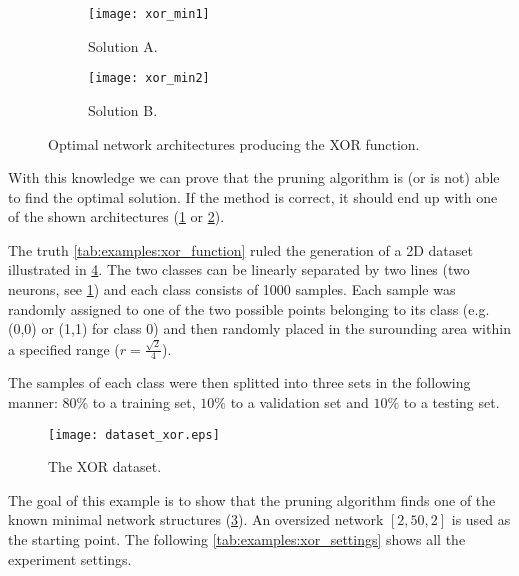 \begin{figure}[H]
\centering
\begin{subfigure}{.4\textwidth}
  \centering
  \texttt{[image: xor\_min1]}
  \caption{Solution A.}
  \label{fig:examples:xor_min1}
\end{subfigure}
\begin{subfigure}{.4\textwidth}
  \centering
  \texttt{[image: xor\_min2]}
  \caption{Solution B.}
  \label{fig:examples:xor_min2}
\end{subfigure}
\caption{Optimal network architectures producing the XOR function.}
\label{fig:examples:xor_solutions}
\end{figure}

With this knowledge we can prove that the pruning algorithm is (or is not) able to find the optimal solution. If the method is correct, it should end up with one of the shown architectures (\cref{fig:examples:xor_min1} or \cref{fig:examples:xor_min2}).

The truth \cref{tab:examples:xor_function} ruled the generation of a 2D dataset illustrated in \cref{fig:examples:dataset_xor}. The two classes can be linearly separated by two lines (two neurons, see \cref{fig:examples:xor_min1}) and each class consists of 1000 samples. Each sample was randomly assigned to one of the two possible points belonging to its class (e.g. (0,0) or (1,1) for class 0) and then randomly placed in the surounding area within a specified range ($ r = \frac{\sqrt{2}}{4} $).

The samples of each class were then splitted into three sets in the following manner: $ 80\% $ to a training set, $ 10\% $ to a validation set and $ 10\% $ to a testing set.

\begin{figure}[H]
\centering
\texttt{[image: dataset\_xor.eps]}
\caption{The XOR dataset.}
\label{fig:examples:dataset_xor}
\end{figure}

The goal of this example is to show that the pruning algorithm finds one of the known minimal network structures (\cref{fig:examples:xor_solutions}). An oversized network $ [2, 50, 2] $ is used as the starting point. The following \cref{tab:examples:xor_settings} shows all the experiment settings.

